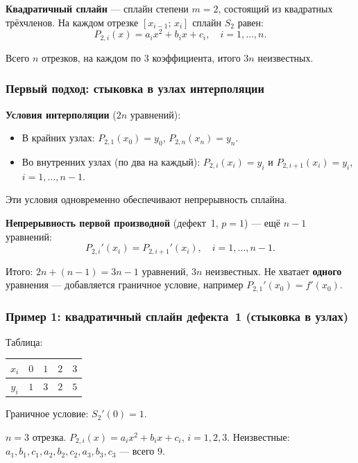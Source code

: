 \textbf{Квадратичный сплайн} --- сплайн степени $m = 2$, состоящий из квадратных трёхчленов. На каждом отрезке $[x_{i-1};\, x_i]$ сплайн $S_2$ равен:
\[
    P_{2,i}(x) = a_i x^2 + b_i x + c_i, \quad i = 1, \ldots, n.
\]

Всего $n$ отрезков, на каждом по 3 коэффициента, итого $3n$ неизвестных.

\subsubsection*{Первый подход: стыковка в узлах интерполяции}

\textbf{Условия интерполяции} ($2n$ уравнений):
\begin{itemize}
    \item В крайних узлах: $P_{2,1}(x_0) = y_0$, $P_{2,n}(x_n) = y_n$.
    \item Во внутренних узлах (по два на каждый): $P_{2,i}(x_i) = y_i$ и $P_{2,i+1}(x_i) = y_i$, $i = 1, \ldots, n-1$.
\end{itemize}

Эти условия одновременно обеспечивают непрерывность сплайна.

\textbf{Непрерывность первой производной} (дефект~1, $p = 1$) --- ещё $n - 1$ уравнений:
\[
    P_{2,i}'(x_i) = P_{2,i+1}'(x_i), \quad i = 1, \ldots, n-1.
\]

Итого: $2n + (n-1) = 3n - 1$ уравнений, $3n$ неизвестных. Не хватает \textbf{одного} уравнения --- добавляется граничное условие, например $P_{2,1}'(x_0) = f'(x_0)$.


\subsubsection*{Пример 1: квадратичный сплайн дефекта~1 (стыковка в узлах)}

Таблица:

\begin{center}
\begin{tabular}{c|cccc}
    $x_i$ & $0$ & $1$ & $2$ & $3$ \\
    \hline
    $y_i$ & $1$ & $3$ & $2$ & $5$
\end{tabular}
\end{center}

Граничное условие: $S_2'(0) = 1$.

$n = 3$ отрезка. $P_{2,i}(x) = a_i x^2 + b_i x + c_i$, $i = 1, 2, 3$. Неизвестные: $a_1, b_1, c_1, a_2, b_2, c_2, a_3, b_3, c_3$ --- всего 9.

